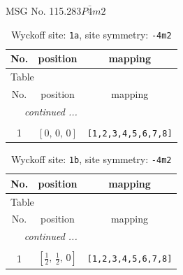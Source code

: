 \documentclass[fleqn,8pt]{jsarticle}
\begin{document}
\setcounter{MaxMatrixCols}{32}

\renewcommand{\tablename}{Table~}
\renewcommand{\figurename}{Figure~}
\begin{center}
\LARGE
MSG No. 115.283\quad$P\bar{4}m2$
\end{center}
\renewcommand{\arraystretch}{1.2}
\begin{longtable}{ccc}
\caption{Wyckoff site: {\tt 1a}, site symmetry: {\tt -4m2}}
 \\
 \hline \hline
No. & position & mapping \\ \hline \endfirsthead

\multicolumn{2}{l}{\tablename\ \thetable{}} \\
 \hline \hline
No. & position & mapping \\ \hline \endhead

 \hline \hline
\multicolumn{2}{r}{\footnotesize\it continued ...} \\ \endfoot

 \hline \hline
\multicolumn{2}{r}{} \\ \endlastfoot

1 & $\left[ 0,\, 0,\, 0 \right]$ & {\tt [1,2,3,4,5,6,7,8]} \\
\end{longtable}
\renewcommand{\arraystretch}{1.2}
\begin{longtable}{ccc}
\caption{Wyckoff site: {\tt 1b}, site symmetry: {\tt -4m2}}
 \\
 \hline \hline
No. & position & mapping \\ \hline \endfirsthead

\multicolumn{2}{l}{\tablename\ \thetable{}} \\
 \hline \hline
No. & position & mapping \\ \hline \endhead

 \hline \hline
\multicolumn{2}{r}{\footnotesize\it continued ...} \\ \endfoot

 \hline \hline
\multicolumn{2}{r}{} \\ \endlastfoot

1 & $\left[ \frac{1}{2},\, \frac{1}{2},\, 0 \right]$ & {\tt [1,2,3,4,5,6,7,8]} \\
\end{longtable}
\renewcommand{\arraystretch}{1.2}
\end{document}
